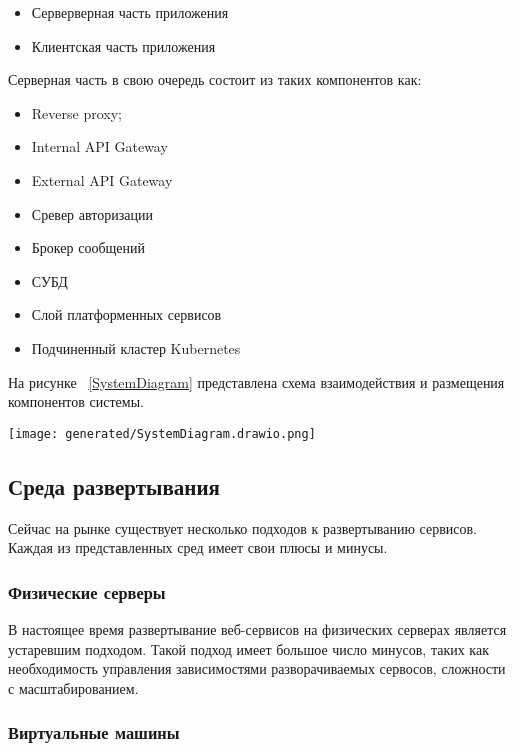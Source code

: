 \begin{itemize}
  \item[---] Серверверная часть приложения
  \item[---] Клиентская часть приложения 
\end{itemize}

Серверная часть в свою очередь состоит из таких компонентов как:

\begin{itemize}
  \item[---] Reverse proxy\cite{sommerlad2003reverse};
  \item[---] Internal API Gateway
  \item[---] External API Gateway
  \item[---] Сревер авторизации
  \item[---] Брокер сообщений
  \item[---] СУБД
  \item[---] Слой платформенных сервисов
  \item[---] Подчиненный кластер Kubernetes
\end{itemize}

На рисунке ~\ref{SystemDiagram} представлена схема взаимодействия и размещения компонентов системы.

\begin{figure*}[!t]
  \centering
  \texttt{[image: generated/SystemDiagram.drawio.png]}
  \caption{Компоненты плфтормы}
  \label{SystemDiagram}
\end{figure*}

\subsection{Среда развертывания}

Сейчас на рынке существует несколько подходов к развертыванию сервисов. Каждая из представленных сред имеет свои плюсы и минусы.

\subsubsection{Физические серверы}

В настоящее время развертывание веб-сервисов на физических серверах является устаревшим подходом. Такой подход имеет большое число минусов, таких как необходимость управления зависимостями разворачиваемых сервосов, сложности с масштабированием.

\subsubsection{Виртуальные машины}

